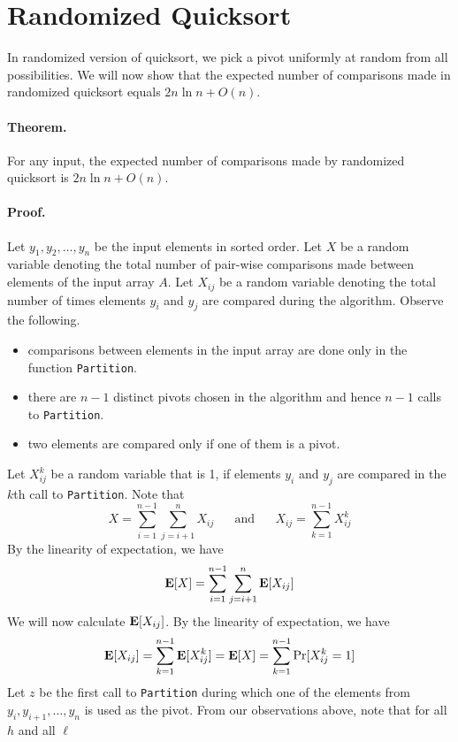 \documentclass[11pt,twoside]{article}
\newcommand{\E}{{\mbox {\bf E}}}
\begin{document}
\section*{Randomized Quicksort}
In randomized version of quicksort, we pick a pivot uniformly at
random from all possibilities. We will
now show that the expected number of comparisons made in randomized
quicksort equals $2n\ln n + O(n)$.

\paragraph{Theorem.} For any input, the expected number of comparisons
made by randomized quicksort is $2n\ln n +O(n)$.

\paragraph{Proof.} Let $y_1,y_2, \ldots, y_n$ be the input elements in
sorted order. Let $X$ be a random variable denoting the total
number of pair-wise comparisons made between elements of the input
array $A$. Let $X_{ij}$ be a random variable denoting the total number
of times elements $y_i$ and $y_j$ are compared during the
algorithm. Observe the following.
\begin{itemize}
\item
comparisons between elements in the input array are done only in the
function \texttt{Partition}.
\item
there are $n-1$ distinct pivots chosen in the algorithm and hence
$n-1$ calls to \texttt{Partition}.
\item
two elements are compared only if one of them is a pivot.
\end{itemize}
Let $X_{ij}^{k}$ be a random variable that is 1, if elements $y_i$ and
$y_j$ are compared in the $k$th call to \texttt{Partition}. Note that
\[
X = \sum_{i=1}^{n-1}\sum_{j=i+1}^{n}X_{ij} \mbox{~~~~~and~~~~~} X_{ij} = \sum_{k=1}^{n-1}X_{ij}^k
\]
By the linearity of expectation, we have
\begin{equation}
\label{eqn:Ex}
\E[X] = \sum_{i=1}^{n-1}\sum_{j=i+1}^{n}\E[X_{ij}]
\end{equation}
We will now calculate $\E[X_{ij}]$. By the linearity of expectation,
we have
\[
\E[X_{ij}] = \sum_{k=1}^{n-1}\E[X_{ij}^{k}] = \E[X] = \sum_{k=1}^{n-1}\Pr[X_{ij}^{k}=1]
\]
Let $z$ be the first call to \texttt{Partition} during which one of
the elements from $y_i,y_{i+1}, \ldots, y_n$ is used as the
pivot. From our observations above, note that for all $h$ and all $\ell$
\end{document}
